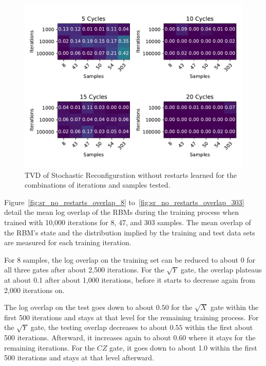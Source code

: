 \begin{figure}[H]
  \centering
  \includegraphics[width=\textwidth]{figures/results/SR-no-restarts-learned/fxeb_heatmap.pdf}
  \caption[Cross Entropy Difference of RBMs Trained with Stochastic Reconfiguration without Random Restarts and $CZ$ Gates Learned]{TVD of Stochastic 
  Reconfiguration without restarts learned for the combinations of iterations and samples tested.}
  \label{fig:sr_no_restarts_fxeb}
\end{figure}

Figure~\ref{fig:sr_no_restarts_overlap_8} to~\ref{fig:sr_no_restarts_overlap_303} detail the mean log overlap of the RBMs during the 
training process when trained with 10,000 iterations for 8, 47, and 303 samples. The 
mean overlap of the RBM's state and the distribution implied by the training and test data sets are measured 
for each training iteration.

For 8 samples, the log overlap on the training set can be reduced to about 0 for all three gates after about 2,500 iterations.
For the $\sqrt{Y}$ gate, the overlap plateaus at about 0.1 after about 1,000 iterations, before it starts 
to decrease again from 2,000 iterations on. 

The log overlap on the test goes down to about $0.50$ for the $\sqrt{X}$ gate within the first 500 iterations and stays at 
that level for the remaining training process. For the $\sqrt{Y}$ gate, the testing overlap decreases to about 
$0.55$ within the first about 500 iterations. Afterward, it increases again to about 0.60 where it stays for the 
remaining iterations. For the $CZ$ gate, it goes down to about 1.0 within the first 500 iterations and stays at 
that level afterward.


